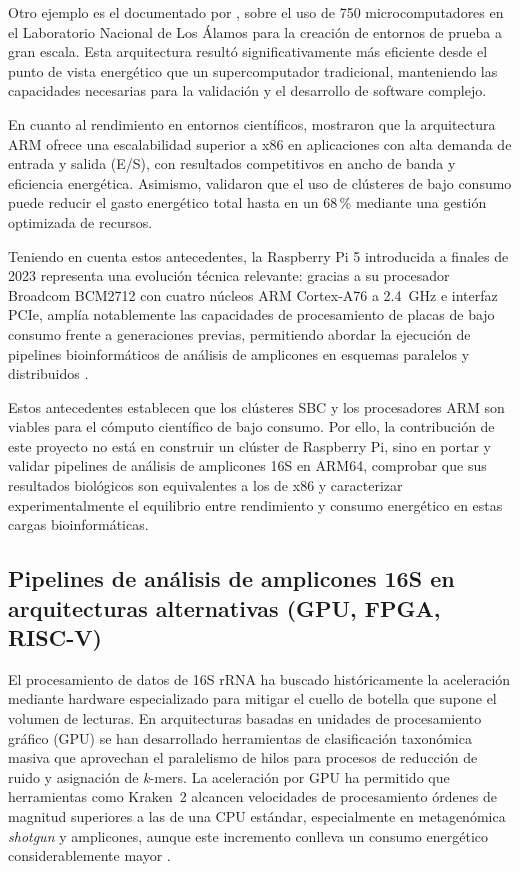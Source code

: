 \documentclass[12pt,oneside,spanish]{book}
\begin{document}
    Otro ejemplo es el documentado por \citet{miller2017}, sobre el uso de 750 microcomputadores en el Laboratorio Nacional de Los Álamos para la creación de entornos de prueba a gran escala. Esta arquitectura resultó significativamente más eficiente desde el punto de vista energético que un supercomputador tradicional, manteniendo las capacidades necesarias para la validación y el desarrollo de software complejo.
    
    En cuanto al rendimiento en entornos científicos, \citet{maqbool2015arm} mostraron que la arquitectura ARM ofrece una escalabilidad superior a x86 en aplicaciones con alta demanda de entrada y salida (E/S), con resultados competitivos en ancho de banda y eficiencia energética. Asimismo, \citet{warade2022} validaron que el uso de clústeres de bajo consumo puede reducir el gasto energético total hasta en un 68\,\% mediante una gestión optimizada de recursos.
    
    Teniendo en cuenta estos antecedentes, la Raspberry Pi 5 introducida a finales de 2023 representa una evolución técnica relevante: gracias a su procesador Broadcom BCM2712 con cuatro núcleos ARM Cortex-A76 a 2.4~GHz e interfaz PCIe, amplía notablemente las capacidades de procesamiento de placas de bajo consumo frente a generaciones previas, permitiendo abordar la ejecución de pipelines bioinformáticos de análisis de amplicones en esquemas paralelos y distribuidos \citep{rpi2023brief}.

    Estos antecedentes establecen que los clústeres SBC y los procesadores ARM son viables para el cómputo científico de bajo consumo. Por ello, la contribución de este proyecto no está en construir un clúster de Raspberry Pi, sino en portar y validar pipelines de análisis de amplicones 16S en ARM64, comprobar que sus resultados biológicos son equivalentes a los de x86 y caracterizar experimentalmente el equilibrio entre rendimiento y consumo energético en estas cargas bioinformáticas.
    
    \subsection{Pipelines de análisis de amplicones 16S en arquitecturas alternativas (GPU, FPGA, RISC-V)}
    
    El procesamiento de datos de 16S rRNA ha buscado históricamente la aceleración mediante hardware especializado para mitigar el cuello de botella que supone el volumen de lecturas. En arquitecturas basadas en unidades de procesamiento gráfico (GPU) se han desarrollado herramientas de clasificación taxonómica masiva que aprovechan el paralelismo de hilos para procesos de reducción de ruido y asignación de \textit{k}-mers. La aceleración por GPU ha permitido que herramientas como Kraken~2 alcancen velocidades de procesamiento órdenes de magnitud superiores a las de una CPU estándar, especialmente en metagenómica \textit{shotgun} y amplicones, aunque este incremento conlleva un consumo energético considerablemente mayor \citep{wood2019kraken2, robinson2021hardware}.
    
\end{document}
